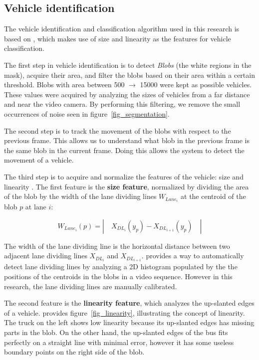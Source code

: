 \documentclass[conference]{IEEEtran}
\begin{document}
\subsection{Vehicle identification}

The vehicle identification and classification algorithm used in this research is based on \cite{Jun-Wei}, which makes use of size and linearity as the features for vehicle classification.



The first step in vehicle identification is to detect \textit{Blobs} (the white regions in the mask), acquire their area, and filter the blobs based on their area within a certain threshold. Blobs with area between 500 $\rightarrow$ 15000 were kept as possible vehicles. These values were acquired by analyzing the sizes of vehicles from a far distance and near the video camera. By performing this filtering, we remove the small occurrences of noise seen in figure~\ref{fig_segmentation}.

The second step is to track the movement of the blobs with respect to the previous frame. This allows us to understand what blob in the previous frame is the same blob in the current frame. Doing this allows the system to detect the movement of a vehicle.

The third step is to acquire and normalize the features of the vehicle: size and linearity \cite{Sobral}. The first feature is the \textbf{size feature}, normalized by dividing the area of the blob by the width of the lane dividing lines $W_{Lane_{i}}$ at the centroid of the blob $p$ at lane $i$:

$$
W_{Lane_{i}}(p) = | \quad X_{DL_{i}}(y_p) - X_{DL_{i + 1}}(y_p) \quad |
$$

The width of the lane dividing line is the horizontal distance between two adjacent lane dividing lines $X_{DL_{i}}$ and $X_{DL_{i+1}}$. \cite{Jun-Wei} provides a way to automatically detect lane dividing lines by analyzing a 2D histogram populated by the the positions of the centroids in the blobs in a video sequence. However in this research, the lane dividing lines are manually calibrated. 

The second feature is the \textbf{linearity feature}, which analyzes the up-slanted edges of a vehicle. \cite{Jun-Wei} provides figure~\ref{fig_linearity}, illustrating the concept of linearity. The truck on the left shows low linearity because its up-slanted edges has missing parts in the blob. On the other hand, the up-slanted edges of the bus fits perfectly on a straight line with minimal error, however it has some useless boundary points on the right side of the blob.
\end{document}
